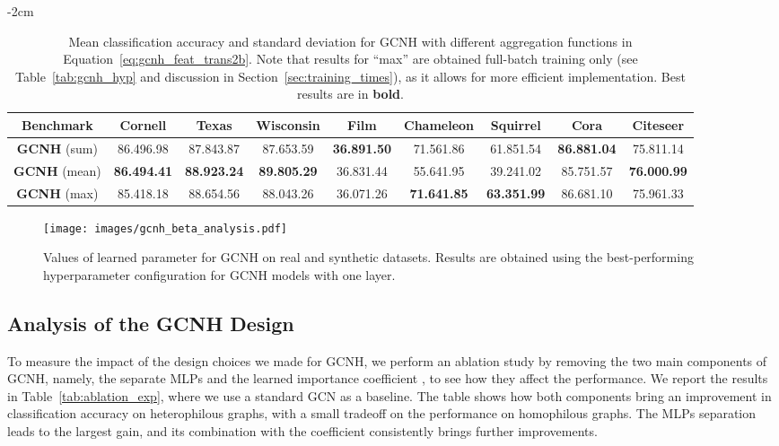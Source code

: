 \documentclass[conference]{IEEEtran}
\begin{document}
\begin{table*}[t]
    \footnotesize
    \centering
    \addtolength{\leftskip} {-2cm}
    \addtolength{\rightskip}{-2cm}
\begin{tabular}{ c c c c c c c c c }
    \toprule
    \textbf{Benchmark} & \textbf{Cornell} & \textbf{Texas} & \textbf{Wisconsin} & \textbf{Film} & \textbf{Chameleon} & \textbf{Squirrel} & \textbf{Cora} & \textbf{Citeseer} \\
\midrule
    \textbf{GCNH} (sum) & 86.496.98 & 87.843.87 & 87.653.59 & \textbf{36.891.50} & 71.561.86 & 61.851.54 & \textbf{86.881.04} & 75.811.14 \\
    \textbf{GCNH} (mean) & \textbf{86.494.41} & \textbf{88.923.24} & \textbf{89.805.29} & 36.831.44 & 55.641.95 & 39.241.02 & 85.751.57 & \textbf{76.000.99} \\
\textbf{GCNH} (max) & 85.418.18 & 88.654.56 & 88.043.26 & 	36.071.26 & \textbf{71.641.85} & \textbf{63.351.99} & 86.681.10 & 75.961.33 \\
    \bottomrule

    \end{tabular}
    \caption{Mean classification accuracy and standard deviation for GCNH with different aggregation functions in Equation~\ref{eq:gcnh_feat_trans2b}. Note that results for ``max'' are obtained full-batch training only (see Table~\ref{tab:gcnh_hyp} and discussion in Section~\ref{sec:training_times}), as it allows for more efficient implementation. Best results are in \textbf{bold}.}
    \label{tab:aggfunc_exp}
\end{table*}



\begin{figure}[t]
\centering
\texttt{[image: images/gcnh\_beta\_analysis.pdf]}
\caption{Values of learned parameter  for GCNH on real and synthetic datasets. Results are obtained using the best-performing hyperparameter configuration for GCNH models with one layer.}
\label{fig:gcnh_beta_analysis}
\end{figure}

\subsection{Analysis of the GCNH Design}\label{sec:experiments-analysis}
To measure the impact of the design choices we made for GCNH, we perform an ablation study by removing the two main components of GCNH, namely, the separate MLPs and the learned importance coefficient , to see how they affect the performance.
We report the results in Table~\ref{tab:ablation_exp}, where we use a standard GCN as a baseline.
The table shows how both components bring an improvement in classification accuracy on heterophilous graphs, with a small tradeoff on the performance on homophilous graphs.
The MLPs separation leads to the largest gain, and its combination with the  coefficient consistently brings further improvements.
\end{document}
